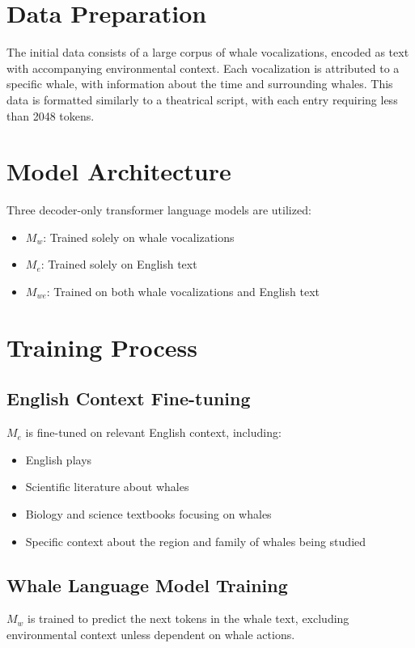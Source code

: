 \documentclass{article}
\begin{document}
\section{Data Preparation}
The initial data consists of a large corpus of whale vocalizations, encoded as text with accompanying environmental context. Each vocalization is attributed to a specific whale, with information about the time and surrounding whales. This data is formatted similarly to a theatrical script, with each entry requiring less than 2048 tokens.

\section{Model Architecture}
Three decoder-only transformer language models are utilized:

\begin{itemize}
    \item $M_w$: Trained solely on whale vocalizations
    \item $M_e$: Trained solely on English text
    \item $M_{we}$: Trained on both whale vocalizations and English text
\end{itemize}

\section{Training Process}
\subsection{English Context Fine-tuning}
$M_e$ is fine-tuned on relevant English context, including:
\begin{itemize}
    \item English plays
    \item Scientific literature about whales
    \item Biology and science textbooks focusing on whales
    \item Specific context about the region and family of whales being studied
\end{itemize}

\subsection{Whale Language Model Training}
$M_w$ is trained to predict the next tokens in the whale text, excluding environmental context unless dependent on whale actions.
\end{document}
